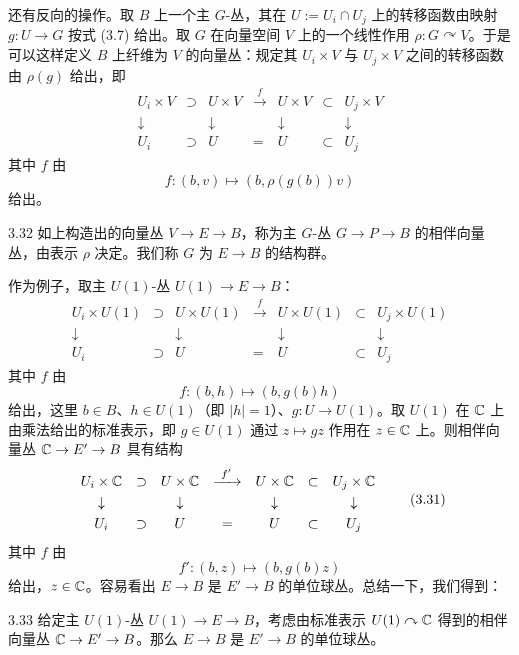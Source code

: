 还有反向的操作。取 $B$ 上一个主 $G$-丛，其在 $U:=U_i\cap U_j$ 上的转移函数由映射 $g:U\to G$ 按式 (3.7) 给出。取 $G$ 在向量空间 $V$ 上的一个线性作用 $\rho:G\curvearrowright V$。于是可以这样定义 $B$ 上纤维为 $V$ 的向量丛：规定其 $U_i\times V$ 与 $U_j\times V$ 之间的转移函数由 $\rho(g)$ 给出，即
{\small\setlength{\arraycolsep}{4pt}
\[
\begin{array}{ccccccc}
U_i\times V & \supset & U\times V & \xrightarrow{\ f\ } & U\times V & \subset & U_j\times V\\[3pt]
\downarrow & & \downarrow & & \downarrow & & \downarrow\\[3pt]
U_i & \supset & U & = & U & \subset & U_j
\end{array}
\tag{3.27}
\]
}
其中 $f$ 由
\[
f:(b,v)\mapsto(b,\rho(g(b))v)
\tag{3.28}
\]
给出。

\begin{definition}{3.32}
如上构造出的向量丛 $V\to E\to B$，称为主 $G$-丛 $G\to P\to B$ 的相伴向量丛，由表示 $\rho$ 决定。我们称 $G$ 为 $E\to B$ 的结构群。
\end{definition}

作为例子，取主 $U(1)$-丛 $U(1)\to E\to B$：
{\small\setlength{\arraycolsep}{4pt}
\[
\begin{array}{ccccccc}
U_i\times U(1) & \supset & U\times U(1) & \xrightarrow{\ f\ } & U\times U(1) & \subset & U_j\times U(1)\\[3pt]
\downarrow & & \downarrow & & \downarrow & & \downarrow\\[3pt]
U_i & \supset & U & = & U & \subset & U_j
\end{array}
\tag{3.29}
\]
}
其中 $f$ 由
\[
f:(b,h)\mapsto(b,g(b)h)
\tag{3.30}
\]
给出，这里 $b\in B$、$h\in U(1)$（即 $|h|=1$）、$g:U\to U(1)$。取 $U(1)$ 在 $\mathbb{C}$ 上由乘法给出的标准表示，即 $g\in U(1)$ 通过 $z\mapsto gz$ 作用在 $z\in\mathbb{C}$ 上。则相伴向量丛 $\mathbb{C}\to E'\to B$ 具有结构
{\small\setlength{\arraycolsep}{4pt}
\[
\begin{array}{ccccccc}
U_i\times\mathbb{C} & \supset & U\times\mathbb{C} & \xrightarrow{\ f'\ } & U\times\mathbb{C} & \subset & U_j\times\mathbb{C}\\[3pt]
\downarrow & & \downarrow & & \downarrow & & \downarrow\\[3pt]
U_i & \supset & U & = & U & \subset & U_j
\end{array}
\tag{3.31}
\]
}
其中 $f$ 由
\[
f':(b,z)\mapsto(b,g(b)z)
\tag{3.32}
\]
给出，$z\in\mathbb{C}$。容易看出 $E\to B$ 是 $E'\to B$ 的单位球丛。总结一下，我们得到：

\begin{proposition}{3.33}
给定主 $U(1)$-丛 $U(1)\to E\to B$，考虑由标准表示 $U(1)\curvearrowright\mathbb{C}$ 得到的相伴向量丛 $\mathbb{C}\to E'\to B$。那么 $E\to B$ 是 $E'\to B$ 的单位球丛。
\end{proposition}

